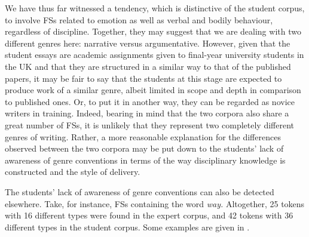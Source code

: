 \documentclass[output=paper]{langscibook}
\begin{document}
We have thus far witnessed a tendency, which is distinctive of the student corpus, to involve FSs related to emotion as well as verbal and bodily behaviour, regardless of discipline. Together, they may suggest that we are dealing with two different genres here: narrative versus argumentative. However, given that the student essays are academic assignments given to final-year university students in the UK and that they are structured in a similar way to that of the published papers, it may be fair to say that the students at this stage are expected to produce work of a similar genre, albeit limited in scope and depth in comparison to published ones. Or, to put it in another way, they can be regarded as novice writers in training. Indeed, bearing in mind that the two corpora also share a great number of FSs, it is unlikely that they represent two completely different genres of writing. Rather, a more reasonable explanation for the differences observed between the two corpora may be put down to the students’ lack of awareness of genre conventions in terms of the way disciplinary knowledge is constructed and the style of delivery.

The students’ lack of awareness of genre conventions can also be detected elsewhere. Take, for instance, FSs containing the word \textit{way.} Altogether, 25 tokens with 16 different types were found in the expert corpus, and 42 tokens with 36 different types in the student corpus. Some examples are given in .
\end{document}
